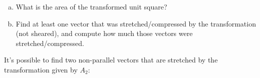 \begin{applicationActivities}{1}{25}
\begin{activity}{5}
\begin{center}
\end{center}

\begin{enumerate}[(a)]
\item What is the area of the transformed unit square?
\item Find at least one vector that was stretched/compressed by the
      transformation (not sheared),
      and compute how much those vectors were stretched/compressed.
\end{enumerate}
\end{activity}

\begin{observation}
  It's possible to find two non-parallel vectors that are stretched by the
  transformation given by \(A_2\):


\end{observation}
\end{applicationActivities}
